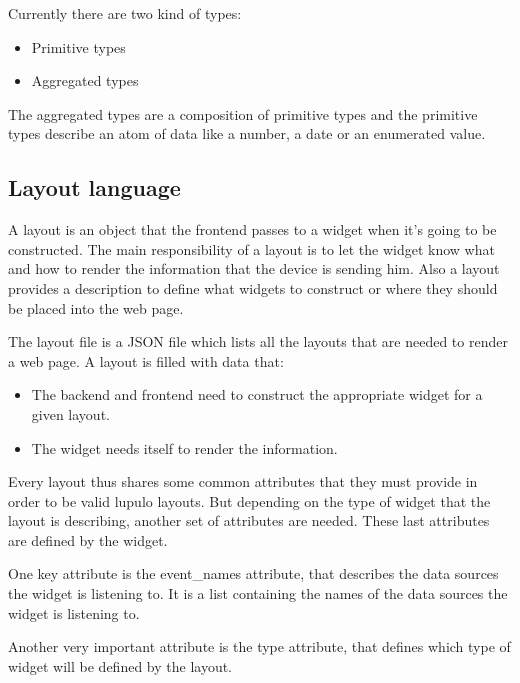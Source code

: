 \documentclass[12pt]{article}
\begin{document}
            Currently there are two kind of types:

            \begin{itemize}
                \item Primitive types
                \item Aggregated types
            \end{itemize}

            The aggregated types are a composition of primitive types and the
            primitive types describe an atom of data like a number, a date or an
            enumerated value.

        \subsection{Layout language}
            A layout is an object that the frontend passes to a widget when it's
            going to be constructed. The main responsibility of a layout is to
            let the widget know what and how to render the information that the
            device is sending him. Also a layout provides a description to
            define what widgets to construct or where they should be placed into
            the web page.

            The layout file is a JSON file which lists all the layouts that
            are needed to render a web page. A layout is filled with data that:
            \begin{itemize}
                \item The backend and frontend need to construct the appropriate
                      widget for a given layout.
                \item The widget needs itself to render the information.
            \end{itemize}

            Every layout thus shares some common attributes that they must
            provide in order to be valid lupulo layouts. But depending on the
            type of widget that the layout is describing, another set of
            attributes are needed. These last attributes are defined by the
            widget.

            One key attribute is the event\_names attribute, that describes the
            data sources the widget is listening to. It is a list containing the
            names of the data sources the widget is listening to.

            Another very important attribute is the type attribute, that defines
            which type of widget will be defined by the layout.
\end{document}
